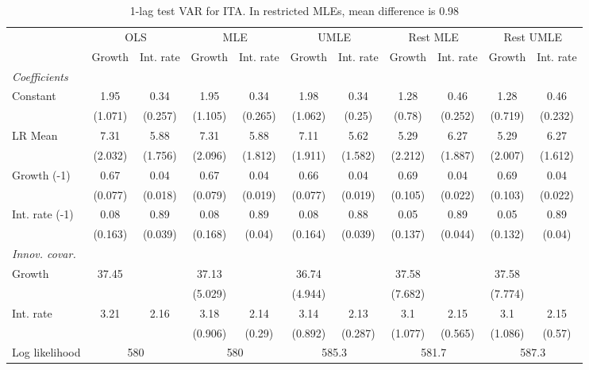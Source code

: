 \begin{table}[htbp] 
	\centering
	\begin{tabular}{@{\extracolsep{4pt}}lcccccccccc@{}}		\hline\hline
		 		 & \multicolumn{2}{c}{OLS} &\multicolumn{2}{c}{MLE} &\multicolumn{2}{c}{UMLE} &\multicolumn{2}{c}{Rest MLE} &\multicolumn{2}{c}{Rest UMLE} \\ 
 		 & Growth 	 & Int. rate 	 & Growth 	 & Int. rate 	 & Growth 	 & Int. rate 	 & Growth 	 & Int. rate 	 & Growth 	 & Int. rate\\\cline{2-3}\cline{4-5}\cline{6-7}\cline{8-9}\cline{10-11}
\rule{0pt}{4ex} 
 \emph{Coefficients} 	  		 & 		 & 		 & 		 & 		 & 		 & 		 & 		 & 		 & 		 &\\ 
\quad Constant 	 & 1.95 	 & 0.34 	 & 1.95 	 & 0.34 	 & 1.98 	 & 0.34 	 & 1.28 	 & 0.46 	 & 1.28 	 & 0.46	 \\ 
 		 & (1.071) 	 & (0.257) 	 & (1.105) 	 & (0.265) 	 & (1.062) 	 & (0.25) 	 & (0.78) 	 & (0.252) 	 & (0.719) 	 & (0.232) 	 \\ 
\quad LR Mean 	 & 7.31 	 & 5.88 	 & 7.31 	 & 5.88 	 & 7.11 	 & 5.62 	 & 5.29 	 & 6.27 	 & 5.29 	 & 6.27	 \\ 
 		 & (2.032) 	 & (1.756) 	 & (2.096) 	 & (1.812) 	 & (1.911) 	 & (1.582) 	 & (2.212) 	 & (1.887) 	 & (2.007) 	 & (1.612) 	 \\ 
\quad Growth (-1) 	 &0.67 	 & 0.04 	 & 0.67 	 & 0.04 	 & 0.66 	 & 0.04 	 & 0.69 	 & 0.04 	 & 0.69 	 & 0.04	 \\ 
 		 & (0.077) 	 & (0.018) 	 & (0.079) 	 & (0.019) 	 & (0.077) 	 & (0.019) 	 & (0.105) 	 & (0.022) 	 & (0.103) 	 & (0.022) 	 \\ 
\quad Int. rate (-1) 	 &0.08 	 & 0.89 	 & 0.08 	 & 0.89 	 & 0.08 	 & 0.88 	 & 0.05 	 & 0.89 	 & 0.05 	 & 0.89	 \\ 
 		 & (0.163) 	 & (0.039) 	 & (0.168) 	 & (0.04) 	 & (0.164) 	 & (0.039) 	 & (0.137) 	 & (0.044) 	 & (0.132) 	 & (0.04) 	 \\ 
\rule{0pt}{4ex} \emph{Innov. covar.}  	 & 	 & 	 & 	 & 	 & 	 & 	 & 	 & 	 & 	 &\\ 
\quad Growth 	 &37.45 	 &  	 & 37.13 	 &  	 & 36.74 	 &  	 & 37.58 	 &  	 & 37.58 	 & 	 \\ 
 		 &  	 &  	 & (5.029) 	 &  	 & (4.944) 	 &  	 & (7.682) 	 &  	 & (7.774) 	 &  	 \\ 
\quad Int. rate 	 &3.21 	 & 2.16 	 & 3.18 	 & 2.14 	 & 3.14 	 & 2.13 	 & 3.1 	 & 2.15 	 & 3.1 	 & 2.15	 \\ 
 		 &  	 &  	 & (0.906) 	 & (0.29) 	 & (0.892) 	 & (0.287) 	 & (1.077) 	 & (0.565) 	 & (1.086) 	 & (0.57) 	 \\ 
 \hline \rule{0pt}{4ex} 
  Log likelihood 	 &\multicolumn{2}{c}{580} 	 & \multicolumn{2}{c}{580} 	 & \multicolumn{2}{c}{585.3} 	 & \multicolumn{2}{c}{581.7} 	 & \multicolumn{2}{c}{587.3}\\ 

 \hline 	\end{tabular}		\caption{1-lag test VAR for ITA. In restricted MLEs, mean difference is 0.98}
		\label{tab:ITA1}

\end{table}